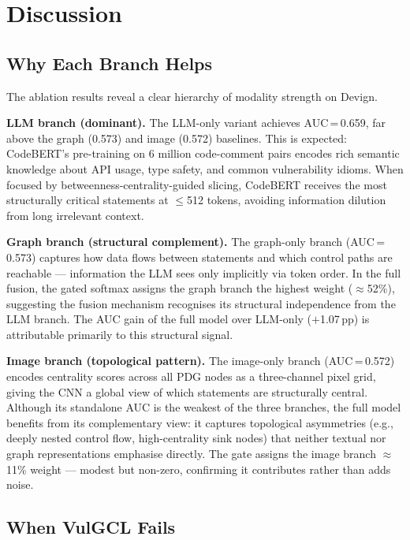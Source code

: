 \section{Discussion}
\label{sec:discussion}

\subsection{Why Each Branch Helps}

The ablation results reveal a clear hierarchy of modality strength on Devign.

\textbf{LLM branch (dominant).}
The LLM-only variant achieves AUC\,=\,0.659, far above the graph (0.573) and image
(0.572) baselines. This is expected: CodeBERT's pre-training on 6 million code-comment
pairs encodes rich semantic knowledge about API usage, type safety, and common
vulnerability idioms. When focused by betweenness-centrality-guided slicing,
CodeBERT receives the most structurally critical statements at $\leq$512 tokens,
avoiding information dilution from long irrelevant context.

\textbf{Graph branch (structural complement).}
The graph-only branch (AUC\,=\,0.573) captures how data flows between statements
and which control paths are reachable — information the LLM sees only implicitly
via token order. In the full fusion, the gated softmax assigns the graph branch the
highest weight ($\approx$52\%), suggesting the fusion mechanism recognises its
structural independence from the LLM branch. The AUC gain of the full model over
LLM-only ($+$1.07\,pp) is attributable primarily to this structural signal.

\textbf{Image branch (topological pattern).}
The image-only branch (AUC\,=\,0.572) encodes centrality scores across all PDG
nodes as a three-channel pixel grid, giving the CNN a global view of which
statements are structurally central. Although its standalone AUC is the weakest of
the three branches, the full model benefits from its complementary view: it captures
topological asymmetries (e.g., deeply nested control flow, high-centrality sink
nodes) that neither textual nor graph representations emphasise directly. The gate
assigns the image branch $\approx$11\% weight — modest but non-zero, confirming it
contributes rather than adds noise.

\subsection{When VulGCL Fails}

